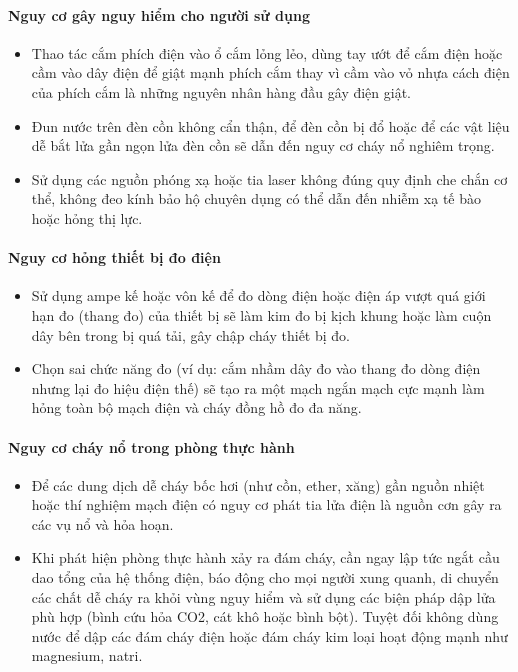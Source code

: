 \paragraph{Nguy cơ gây nguy hiểm cho người sử dụng}
\begin{itemize}
\item Thao tác cắm phích điện vào ổ cắm lỏng lẻo, dùng tay ướt để cắm điện hoặc cầm vào dây điện để giật mạnh phích cắm thay vì cầm vào vỏ nhựa cách điện của phích cắm là những nguyên nhân hàng đầu gây điện giật.
\item Đun nước trên đèn cồn không cẩn thận, để đèn cồn bị đổ hoặc để các vật liệu dễ bắt lửa gần ngọn lửa đèn cồn sẽ dẫn đến nguy cơ cháy nổ nghiêm trọng.
\item Sử dụng các nguồn phóng xạ hoặc tia laser không đúng quy định che chắn cơ thể, không đeo kính bảo hộ chuyên dụng có thể dẫn đến nhiễm xạ tế bào hoặc hỏng thị lực.
\end{itemize}

\paragraph{Nguy cơ hỏng thiết bị đo điện}
\begin{itemize}
\item Sử dụng ampe kế hoặc vôn kế để đo dòng điện hoặc điện áp vượt quá giới hạn đo (thang đo) của thiết bị sẽ làm kim đo bị kịch khung hoặc làm cuộn dây bên trong bị quá tải, gây chập cháy thiết bị đo.
\item Chọn sai chức năng đo (ví dụ: cắm nhầm dây đo vào thang đo dòng điện nhưng lại đo hiệu điện thế) sẽ tạo ra một mạch ngắn mạch cực mạnh làm hỏng toàn bộ mạch điện và cháy đồng hồ đo đa năng.
\end{itemize}

\paragraph{Nguy cơ cháy nổ trong phòng thực hành}
\begin{itemize}
\item Để các dung dịch dễ cháy bốc hơi (như cồn, ether, xăng) gần nguồn nhiệt hoặc thí nghiệm mạch điện có nguy cơ phát tia lửa điện là nguồn cơn gây ra các vụ nổ và hỏa hoạn.
\item Khi phát hiện phòng thực hành xảy ra đám cháy, cần ngay lập tức ngắt cầu dao tổng của hệ thống điện, báo động cho mọi người xung quanh, di chuyển các chất dễ cháy ra khỏi vùng nguy hiểm và sử dụng các biện pháp dập lửa phù hợp (bình cứu hỏa CO2, cát khô hoặc bình bột). Tuyệt đối không dùng nước để dập các đám cháy điện hoặc đám cháy kim loại hoạt động mạnh như magnesium, natri.
\end{itemize}

